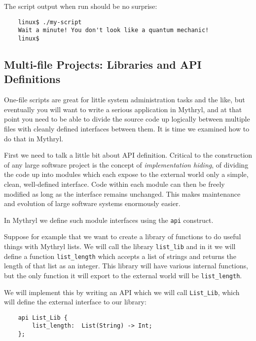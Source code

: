 The script output when run should be no surprise:

\begin{verbatim}
    linux$ ./my-script
    Wait a minute! You don't look like a quantum mechanic!
    linux$
\end{verbatim}


\cutend*

\subsection{Multi-file Projects: Libraries and API Definitions}
\label{section:tut:delving-deeper:libraries-and-apis}


One-file scripts are great for little system administration tasks 
and the like, but eventually you will want to write a serious 
application in Mythryl, and at that point you need to be able to 
divide the source code up logically between multiple files with 
cleanly defined interfaces between them.  It is time we examined 
how to do that in Mythryl.

First we need to talk a little bit about API definition.  Critical 
to the construction of any large software project is the concept 
of {\it implementation hiding}, of dividing the code up into modules 
which each expose to the external world only a simple, clean, 
well-defined interface.  Code within each module can then be 
freely modified as long as the interface remains unchanged. 
This makes maintenance and evolution of large software systems 
enormously easier.

In Mythryl we define such module interfaces using the {\tt api} 
construct.

Suppose for example that we want to create a library of functions to do useful 
things with Mythryl lists.  We will call the library {\tt list\_lib} 
and in it we will define a function {\tt list\_length} which accepts 
a list of strings and returns the length of that list as an integer. 
This library will have various internal functions, but the only 
function it will export to the external world will be {\tt list\_length}.

We will implement this by writing an API which we will call 
{\tt List\_Lib}, which will define the external interface to our 
library:

\begin{verbatim}
    api List_Lib {
        list_length:  List(String) -> Int;
    };
\end{verbatim}

